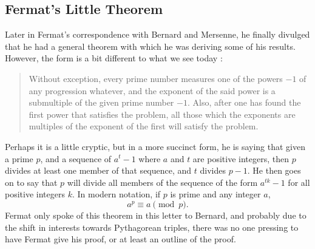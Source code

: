 \documentclass[11pt]{article}
\begin{document}
\subsection*{Fermat's Little Theorem}
Later in Fermat's correspondence with Bernard and Mersenne, he finally divulged
that he had a general theorem with which he was deriving some of his results.
However, the form is a bit different to what we see today \cite{Mahoney}: 
    \begin{quote}
        Without exception, every prime number measures one of the powers $- 1$    
        of any progression whatever, and the exponent of the said power is a
        submultiple of the given prime number $-1$.
        Also, after one has found the first power that satisfies the problem,
        all those which the exponents are multiples of the exponent of the first
        will satisfy the problem.
    \end{quote}
Perhaps it is a little cryptic, but in a more succinct form, he is saying that
given a prime $p$, and a sequence of $a^t - 1$ where $a$ and $t$ are positive
integers, then $p$ divides at least one member of that sequence, and $t$ divides
$p-1$.
He then goes on to say that $p$ will divide all members of the sequence of the
form $a^{tk} - 1$ for all positive integers $k$.
In modern notation, if $p$ is prime and any integer $a$,
\[a^p \equiv a \pmod{p}. \]
Fermat only spoke of this theorem in this letter to Bernard, and probably due to
the shift in interests towards Pythagorean triples, there was no one pressing
to have Fermat give his proof, or at least an outline of the proof.
\end{document}
